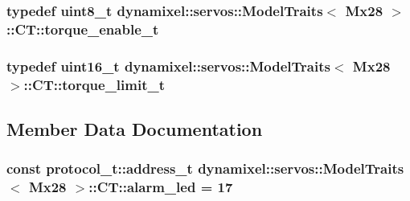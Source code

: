 \subsubsection[{\texorpdfstring{torque\+\_\+enable\+\_\+t}{torque_enable_t}}]{\setlength{\rightskip}{0pt plus 5cm}typedef uint8\+\_\+t {\bf dynamixel\+::servos\+::\+Model\+Traits}$<$ {\bf Mx28} $>$\+::{\bf C\+T\+::torque\+\_\+enable\+\_\+t}}\hypertarget{structdynamixel_1_1servos_1_1_model_traits_3_01_mx28_01_4_1_1_c_t_a4bfea761915609e34c68b545fe57a8c6}{}\label{structdynamixel_1_1servos_1_1_model_traits_3_01_mx28_01_4_1_1_c_t_a4bfea761915609e34c68b545fe57a8c6}
\subsubsection[{\texorpdfstring{torque\+\_\+limit\+\_\+t}{torque_limit_t}}]{\setlength{\rightskip}{0pt plus 5cm}typedef uint16\+\_\+t {\bf dynamixel\+::servos\+::\+Model\+Traits}$<$ {\bf Mx28} $>$\+::{\bf C\+T\+::torque\+\_\+limit\+\_\+t}}\hypertarget{structdynamixel_1_1servos_1_1_model_traits_3_01_mx28_01_4_1_1_c_t_a418e386ee5c30a82a04d06cd3469b93e}{}\label{structdynamixel_1_1servos_1_1_model_traits_3_01_mx28_01_4_1_1_c_t_a418e386ee5c30a82a04d06cd3469b93e}


\subsection{Member Data Documentation}
\subsubsection[{\texorpdfstring{alarm\+\_\+led}{alarm_led}}]{\setlength{\rightskip}{0pt plus 5cm}const {\bf protocol\+\_\+t\+::address\+\_\+t} {\bf dynamixel\+::servos\+::\+Model\+Traits}$<$ {\bf Mx28} $>$\+::C\+T\+::alarm\+\_\+led = 17\hspace{0.3cm}{\ttfamily [static]}}\hypertarget{structdynamixel_1_1servos_1_1_model_traits_3_01_mx28_01_4_1_1_c_t_a64a8985f1aa2ea952b98a59571bfdc36}{}\label{structdynamixel_1_1servos_1_1_model_traits_3_01_mx28_01_4_1_1_c_t_a64a8985f1aa2ea952b98a59571bfdc36}
